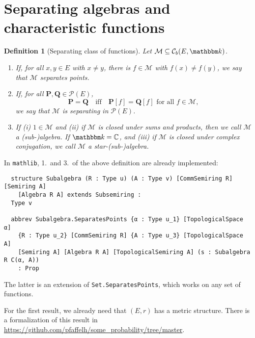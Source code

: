 \documentclass{article}
\newtheorem{definition}[proposition]{Definition}
\theoremstyle{definition}
\theoremstyle{step} \newtheorem{step}{Step}
\newcommand{\leanline}[1]{\texttt{#1}}%
\begin{document}
\section{Separating algebras and characteristic functions}

\begin{definition}[Separating class of functions]
  \mbox{} Let $\mathcal M \subseteq \mathcal C_{b}(E,\mathbbm k)$.
  \begin{enumerate}
    \item If, for all $x,y\in E$ with $x\neq y$, there is
          $f\in\mathcal M$ with $f(x)\neq f(y)$, we say that $\mathcal M$
          separates points.
    \item
          If, for all $\mathbf P, \mathbf Q\in\mathcal P(E)$,
          $$ \mathbf P = \mathbf Q \quad \text{iff}\quad \mathbf P[f] =
            \mathbf Q[f] \text{ for all } f\in\mathcal M,$$ we say that
          $\mathcal M$ is separating in $\mathcal P(E)$.
    \item If (i) $1\in\mathcal M$ and (ii) if $\mathcal M$ is closed
          under sums and products, then we call $\mathcal M$ a
          (sub-)algebra.  If $\mathbbm k = \mathbb C$, and (iii) if
          $\mathcal M$ is closed under complex conjugation, we call
          $\mathcal M$ a star-(sub-)algebra.
  \end{enumerate}
\end{definition}

In \leanline{mathlib}, 1.\ and 3.\ of the above definition are already
implemented:

\begin{verbatim}
  structure Subalgebra (R : Type u) (A : Type v) [CommSemiring R] [Semiring A]
    [Algebra R A] extends Subsemiring :
  Type v

  abbrev Subalgebra.SeparatesPoints {α : Type u_1} [TopologicalSpace α]
    {R : Type u_2} [CommSemiring R] {A : Type u_3} [TopologicalSpace A]
    [Semiring A] [Algebra R A] [TopologicalSemiring A] (s : Subalgebra R C(α, A))
    : Prop
\end{verbatim}

The latter is an extension of \leanline{Set.SeparatesPoints}, which
works on any set of functions.

\noindent
For the first result, we already need that $(E,r)$ has a metric
structure. There is a formalization of this result in
\url{https://github.com/pfaffelh/some_probability/tree/master}.
\end{document}
